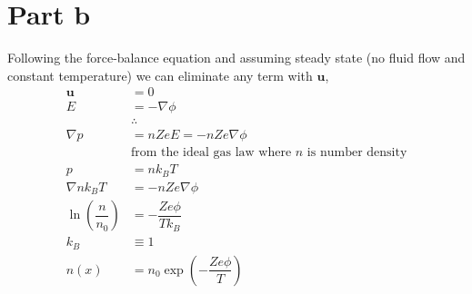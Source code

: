 \documentclass[10pt,a4paper]{article}
\begin{document}
	\section{Part b}
	Following the force-balance equation and assuming steady state (no fluid flow and constant temperature) we can eliminate any term with $\bm{u}$,
	\begin{subequations}
		\begin{align}
			\bm{u} &= 0\\
			E &= -\nabla \phi \\
			&\therefore \nonumber\\
			\nabla p &= n Z e E = -n Z e \nabla \phi \\
			&\textrm{from the ideal gas law where $n$ is number density} \nonumber\\
			p &= n k_{B} T \\
			\nabla n k_{B} T &= -n Z e \nabla \phi \\
			\ln\left(\dfrac{n}{n_{0}}\right) &= - \dfrac{Ze \phi}{T k_{B}}\\
			k_{B} &\equiv 1 \nonumber\\
			n(x) &= n_{0} \exp\left(-\dfrac{Z e \phi}{T}\right) \label{e:ndens}
		\end{align}
	\end{subequations}
	
\end{document}
